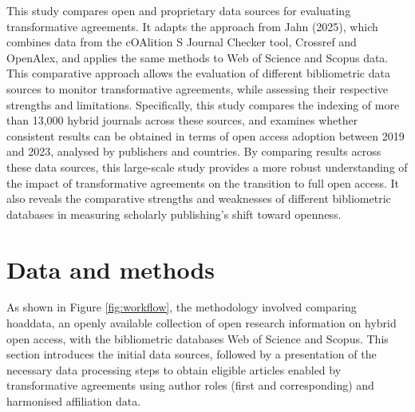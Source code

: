 \documentclass[a4paper,man,floatsintext,longtable,noextraspace,10pt]{apa6}
\begin{document}
This study compares open and proprietary data sources for evaluating
transformative agreements. It adapts the approach from Jahn (2025),
which combines data from the cOAlition S Journal Checker tool, Crossref
and OpenAlex, and applies the same methods to Web of Science and Scopus
data. This comparative approach allows the evaluation of different
bibliometric data sources to monitor transformative agreements, while
assessing their respective strengths and limitations. Specifically, this
study compares the indexing of more than 13,000 hybrid journals across
these sources, and examines whether consistent results can be obtained
in terms of open access adoption between 2019 and 2023, analysed by
publishers and countries. By comparing results across these data
sources, this large-scale study provides a more robust understanding of
the impact of transformative agreements on the transition to full open
access. It also reveals the comparative strengths and weaknesses of
different bibliometric databases in measuring scholarly publishing's
shift toward openness.

\section{Data and methods}\label{data-and-methods}

As shown in Figure \ref{fig:workflow}, the methodology involved
comparing hoaddata, an openly available collection of open research
information on hybrid open access, with the bibliometric databases Web
of Science and Scopus. This section introduces the initial data sources,
followed by a presentation of the necessary data processing steps to
obtain eligible articles enabled by transformative agreements using
author roles (first and corresponding) and harmonised affiliation data.
\end{document}
